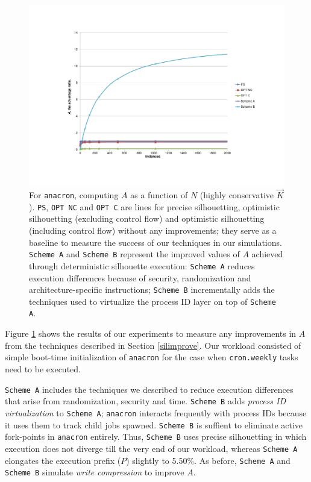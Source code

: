 \begin{figure}[h]
  \center
  \includegraphics[scale=0.80, trim=5cm 3cm 0cm 3cm]{anacron-1.pdf}
  \caption[For \texttt{anacron}, $A$ as a function of $N$ (highly conservative $\vec K$)]%
          {
            For \texttt{anacron}, computing $A$ as a function of $N$ (highly conservative $\vec K$).\newline
            \texttt{PS}, \texttt{OPT NC} and \texttt{OPT C} are lines for precise silhouetting, optimistic 
            silhouetting (excluding control flow) and optimistic silhouetting
            (including control flow) without any improvements; they
            serve as a baseline to measure the success of our techniques
            in our simulations. \texttt{Scheme A} and \texttt{Scheme B} represent the improved values of $A$
            achieved through deterministic silhouette execution:
            \texttt{Scheme A} reduces execution differences because
            of security, randomization and architecture-specific instructions;
            \texttt{Scheme B} incrementally adds the techniques used to
            virtualize the process ID layer on top of \texttt{Scheme A}.            
          }
  \label{anacron1}
\end{figure}

\newpage
\noindent Figure \ref{anacron1} shows the results of our experiments
to measure any improvements in $A$ from the techniques described in Section \ref{silimprove}.
Our workload consisted of simple boot-time initialization of \texttt{anacron}
for the case when \texttt{cron.weekly} tasks need to be executed.

\texttt{Scheme A} includes the techniques we described to reduce
execution differences that arise from randomization, security and time.
\texttt{Scheme B} adds {\em process ID virtualization}
to \texttt{Scheme A}; \texttt{anacron} interacts
frequently with process IDs because it uses them to track
child jobs spawned. \texttt{Scheme B} is suffient to eliminate active fork-points in \texttt{anacron}
entirely. Thus, \texttt{Scheme B} uses precise silhouetting
in which execution does not diverge till the very end of our workload,
whereas \texttt{Scheme A} elongates the execution prefix ($P$) slightly
to 5.50\%. As before, \texttt{Scheme A} and \texttt{Scheme B} simulate {\em write compression}
to improve $A$. 

